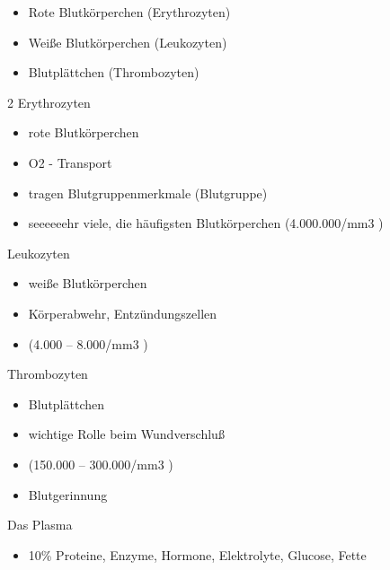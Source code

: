 \documentclass{article}
\begin{document}
\begin{itemize}
\item Rote Blutk\"orperchen (Erythrozyten)

\item Wei{\ss}e Blutk\"orperchen (Leukozyten)

\item Blutpl\"attchen (Thrombozyten)

\end{itemize}
\begin{multicols}{2}
Erythrozyten 

\begin{itemize}
\item rote Blutk\"orperchen

\item O2 - Transport

\item tragen Blutgruppenmerkmale (Blutgruppe)

\item seeeeeehr viele, die h\"aufigsten Blutk\"orperchen (4.000.000/mm3
)

\end{itemize}
Leukozyten 

\begin{itemize}
\item wei{\ss}e Blutk\"orperchen 

\item K\"orperabwehr, Entz\"undungszellen

\item (4.000 -- 8.000/mm3 )

\end{itemize}
Thrombozyten 

\begin{itemize}
\item {}Blutpl\"attchen

\item wichtige Rolle beim Wundverschlu{\ss}

\item (150.000 -- 300.000/mm3 )

\item Blutgerinnung

\end{itemize}
Das Plasma

\begin{itemize}
\item 10\% Proteine, Enzyme, Hormone, Elektrolyte, Glucose, Fette


\end{itemize}
\end{multicols}
\end{document}
